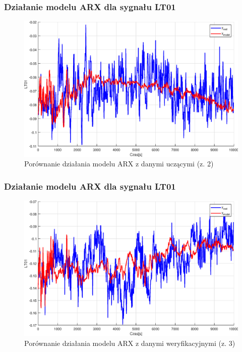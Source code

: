 \addtocounter{framenumber}{-1}
\begin{frame}
  \frametitle{Działanie modelu ARX dla sygnału LT01}
  \begin{figure}[H]
    \centering
    \includegraphics[width=0.75\linewidth,keepaspectratio]{results_matlab/LT01_2.eps}
    \caption{Porównanie działania modelu ARX z danymi uczącymi (z. 2)}
    \label{fig:test}
    \end{figure}
\end{frame}

\addtocounter{framenumber}{-1}
\begin{frame}
  \frametitle{Działanie modelu ARX dla sygnału LT01}
  \begin{figure}[H]
    \centering
    \includegraphics[width=0.75\linewidth,keepaspectratio]{results_matlab/LT01_3.eps}
    \caption{Porównanie działania modelu ARX z danymi weryfikacyjnymi (z. 3)}
    \label{fig:test}
    \end{figure}
\end{frame}

